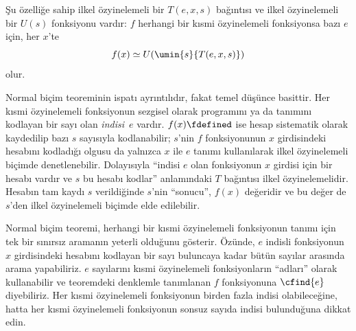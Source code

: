 


\begin{thm}
Şu özelliğe sahip ilkel özyinelemeli bir $T(e,x,s)$ bağıntısı ve ilkel
özyinelemeli bir $U(s)$ fonksiyonu vardır: $f$ herhangi bir kısmi
özyinelemeli fonksiyonsa bazı $e$ için, her $x$'te
\[
  f(x)\simeq U(\umin{s}{T(e,x,s)})
\]
olur.
\end{thm}

\begin{explain}
Normal biçim teoreminin ispatı ayrıntılıdır, fakat temel düşünce basittir.
Her kısmi özyinelemeli fonksiyonun sezgisel olarak programını ya da tanımını
kodlayan bir sayı olan \emph{indisi}~$e$ vardır. $f(x)\fdefined$ ise hesap
sistematik olarak kaydedilip bazı $s$ sayısıyla kodlanabilir; $s$'nin
$f$ fonksiyonunun $x$ girdisindeki hesabını kodladığı olgusu da yalnızca
$x$ ile $e$ tanımı kullanılarak ilkel özyinelemeli biçimde denetlenebilir.
Dolayısıyla ``indisi $e$ olan fonksiyonun $x$ girdisi için bir hesabı vardır
ve $s$ bu hesabı kodlar'' anlamındaki $T$ bağıntısı ilkel özyinelemelidir.
Hesabın tam kaydı $s$ verildiğinde $s$'nin ``sonucu'', $f(x)$ değeridir ve bu
değer de $s$'den ilkel özyinelemeli biçimde elde edilebilir.

Normal biçim teoremi, herhangi bir kısmi özyinelemeli fonksiyonun tanımı için
tek bir sınırsız aramanın yeterli olduğunu gösterir. Özünde, $e$ indisli
fonksiyonun $x$ girdisindeki hesabını kodlayan bir sayı buluncaya kadar bütün
sayılar arasında arama yapabiliriz. $e$ sayılarını kısmi özyinelemeli
fonksiyonların ``adları'' olarak kullanabilir ve teoremdeki denklemle
tanımlanan $f$ fonksiyonuna $\cfind{e}$ diyebiliriz. Her kısmi özyinelemeli
fonksiyonun birden fazla indisi olabileceğine, hatta her kısmi özyinelemeli
fonksiyonun sonsuz sayıda indisi bulunduğuna dikkat edin.
\end{explain}
